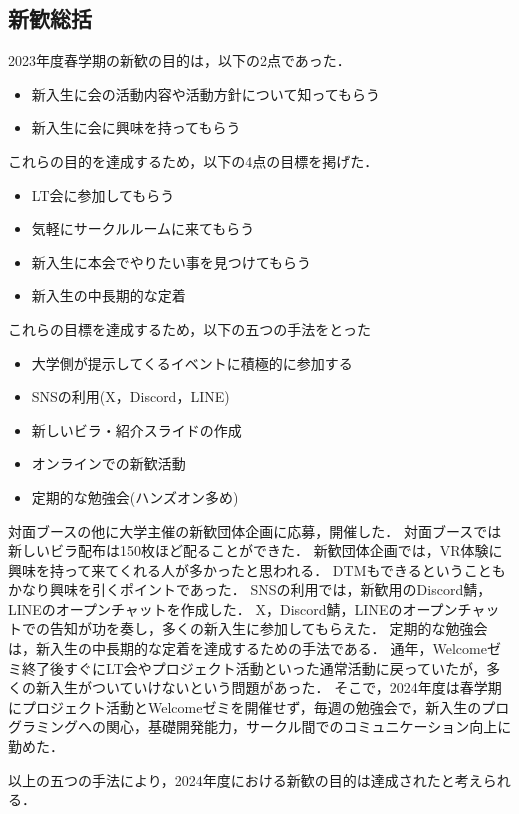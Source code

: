 \subsection*{新歓総括}


2023年度春学期の新歓の目的は，以下の2点であった．

\begin{itemize}
    \item 新入生に会の活動内容や活動方針について知ってもらう
    \item 新入生に会に興味を持ってもらう
\end{itemize}

これらの目的を達成するため，以下の4点の目標を掲げた．

\begin{itemize}
    \item LT会に参加してもらう
    \item 気軽にサークルルームに来てもらう
    \item 新入生に本会でやりたい事を見つけてもらう
    \item 新入生の中長期的な定着
\end{itemize}

これらの目標を達成するため，以下の五つの手法をとった
\begin{itemize}
    \item 大学側が提示してくるイベントに積極的に参加する
    \item SNSの利用(X，Discord，LINE)
    \item 新しいビラ・紹介スライドの作成
    \item オンラインでの新歓活動
    \item 定期的な勉強会(ハンズオン多め)
\end{itemize}

対面ブースの他に大学主催の新歓団体企画に応募，開催した．
対面ブースでは新しいビラ配布は150枚ほど配ることができた．
新歓団体企画では，VR体験に興味を持って来てくれる人が多かったと思われる．
DTMもできるということもかなり興味を引くポイントであった．
SNSの利用では，新歓用のDiscord鯖，LINEのオープンチャットを作成した．
X，Discord鯖，LINEのオープンチャットでの告知が功を奏し，多くの新入生に参加してもらえた．
定期的な勉強会は，新入生の中長期的な定着を達成するための手法である．
通年，Welcomeゼミ終了後すぐにLT会やプロジェクト活動といった通常活動に戻っていたが，多くの新入生がついていけないという問題があった．
そこで，2024年度は春学期にプロジェクト活動とWelcomeゼミを開催せず，毎週の勉強会で，新入生のプログラミングへの関心，基礎開発能力，サークル間でのコミュニケーション向上に勤めた．

以上の五つの手法により，2024年度における新歓の目的は達成されたと考えられる．
